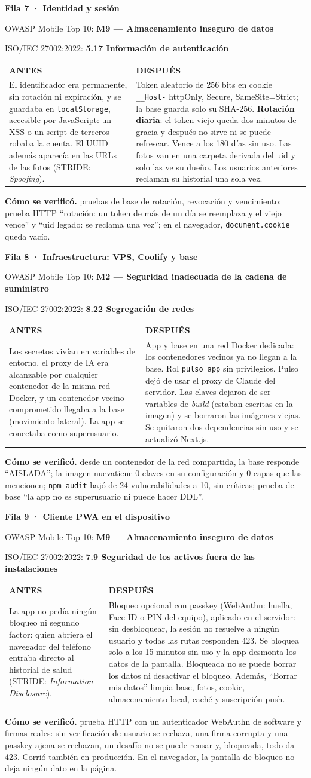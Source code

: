 \documentclass[11pt,letterpaper]{article}
\makeatletter
\newcommand{\cod}[1]{\texttt{#1}}
\newcommand{\fila}[7]{%
  \par\vspace{8pt}\noindent
  \begin{minipage}{\linewidth}%
  {\large\bfseries\color{tinta}Fila #1 · #2}\par\vspace{2pt}
  {\small\color{gris}OWASP Mobile Top 10: \textbf{#3}\par
   ISO/IEC 27002:2022: \textbf{#4}\par}\vspace{4pt}
  \renewcommand{\arraystretch}{1.25}%
  \begin{tabularx}{\linewidth}{@{}>{\raggedright\arraybackslash\small}X@{\hspace{6pt}}>{\raggedright\arraybackslash\small}X@{}}
    \cellcolor{antesbg}\textbf{\color{antes}ANTES} & \cellcolor{despuesbg}\textbf{\color{despues}DESPUÉS} \\
    \cellcolor{antesbg}#5 & \cellcolor{despuesbg}#6 \\
  \end{tabularx}\par\vspace{3pt}
  {\small\textbf{Cómo se verificó.} #7}\par
  \end{minipage}\par\vspace{4pt}
}
\makeatother
\begin{document}
\fila{7}{Identidad y sesión}{M9 — Almacenamiento inseguro de datos}{5.17 Información de autenticación}
{El identificador era permanente, sin rotación ni expiración, y se guardaba en \cod{localStorage}, accesible por JavaScript: un XSS o un script de terceros robaba la cuenta. El UUID además aparecía en las URLs de las fotos (STRIDE: \textit{Spoofing}).}
{Token aleatorio de 256 bits en cookie \cod{\_\_Host-} httpOnly, Secure, SameSite=Strict; la base guarda solo su SHA-256. \textbf{Rotación diaria}: el token viejo queda dos minutos de gracia y después no sirve ni se puede refrescar. Vence a los 180 días sin uso. Las fotos van en una carpeta derivada del uid y solo las ve su dueño. Los usuarios anteriores reclaman su historial una sola vez.}
{pruebas de base de rotación, revocación y vencimiento; prueba HTTP ``rotación: un token de más de un día se reemplaza y el viejo vence'' y ``uid legado: se reclama una vez''; en el navegador, \cod{document.cookie} queda vacío.}

\fila{8}{Infraestructura: VPS, Coolify y base}{M2 — Seguridad inadecuada de la cadena de suministro}{8.22 Segregación de redes}
{Los secretos vivían en variables de entorno, el proxy de IA era alcanzable por cualquier contenedor de la misma red Docker, y un contenedor vecino comprometido llegaba a la base (movimiento lateral). La app se conectaba como superusuario.}
{App y base en una red Docker dedicada: los contenedores vecinos ya no llegan a la base. Rol \cod{pulso\_app} sin privilegios. Pulso dejó de usar el proxy de Claude del servidor. Las claves dejaron de ser variables de \textit{build} (estaban escritas en la imagen) y se borraron las imágenes viejas. Se quitaron dos dependencias sin uso y se actualizó Next.js.}
{desde un contenedor de la red compartida, la base responde ``AISLADA''; la imagen nueva\linebreak[0] tiene 0 claves en su configuración y 0 capas que las mencionen; \cod{npm audit} bajó de 24 vulnerabilidades a 10, sin críticas; prueba de base ``la app no es superusuario ni puede hacer DDL''.}

\fila{9}{Cliente PWA en el dispositivo}{M9 — Almacenamiento inseguro de datos}{7.9 Seguridad de los activos fuera de las instalaciones}
{La app no pedía ningún bloqueo ni segundo factor: quien abriera el navegador del teléfono entraba directo al historial de salud (STRIDE: \textit{Information Disclosure}).}
{Bloqueo opcional con passkey (WebAuthn: huella, Face ID o PIN del equipo), aplicado en el servidor: sin desbloquear, la sesión no resuelve a ningún usuario y todas las rutas responden 423. Se bloquea solo a los 15 minutos sin uso y la app desmonta los datos de la pantalla. Bloqueada no se puede borrar los datos ni desactivar el bloqueo. Además, ``Borrar mis datos'' limpia base, fotos, cookie, almacenamiento local, caché y suscripción push.}
{prueba HTTP con un autenticador WebAuthn de software y firmas reales: sin verificación de usuario se rechaza, una firma corrupta y una passkey ajena se rechazan, un desafío no se puede reusar y, bloqueada, todo da 423. Corrió también en producción. En el navegador, la pantalla de bloqueo no deja ningún dato en la página.}
\end{document}
